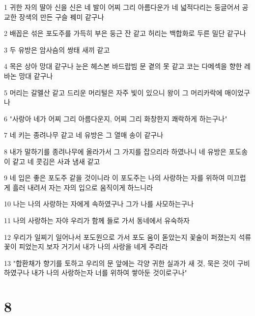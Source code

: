\par 1 귀한 자의 딸아 신을 신은 네 발이 어찌 그리 아름다운가 네 넓적다리는 둥글어서 공교한 장색의 만든 구슬 꿰미 같구나
\par 2 배꼽은 섞은 포도주를 가득히 부은 둥근 잔 같고 허리는 백합화로 두른 밀단 같구나
\par 3 두 유방은 암사슴의 쌍태 새끼 같고
\par 4 목은 상아 망대 같구나 눈은 헤스본 바드랍빔 문 곁의 못 같고 코는 다메섹을 향한 레바논 망대 같구나
\par 5 머리는 갈멜산 같고 드리운 머리털은 자주 빛이 있으니 왕이 그 머리카락에 매이었구나
\par 6 "사랑아 네가 어찌 그리 아름다운지, 어찌 그리 화창한지 쾌락하게 하는구나"
\par 7 네 키는 종려나무 같고 네 유방은 그 열매 송이 같구나
\par 8 내가 말하기를 종려나무에 올라가서 그 가지를 잡으리라 하였나니 네 유방은 포도송이 같고 네 콧김은 사과 냄새 같고
\par 9 네 입은 좋은 포도주 같을 것이니라 이 포도주는 나의 사랑하는 자를 위하여 미끄럽게 흘러 내려서 자는 자의 입으로 움직이게 하느니라
\par 10 나는 나의 사랑하는 자에게 속하였구나 그가 나를 사모하는구나
\par 11 나의 사랑하는 자야 우리가 함께 들로 가서 동네에서 유숙하자
\par 12 우리가 일찌기 일어나서 포도원으로 가서 포도 움이 돋았는지 꽃술이 퍼졌는지 석류꽃이 피었는지 보자 거기서 내가 나의 사랑을 네게 주리라
\par 13 "합환채가 향기를 토하고 우리의 문 앞에는 각양 귀한 실과가 새 것, 묵은 것이 구비하였구나 내가 나의 사랑하는자 너를 위하여 쌓아둔 것이로구나"

\chapter{8}

